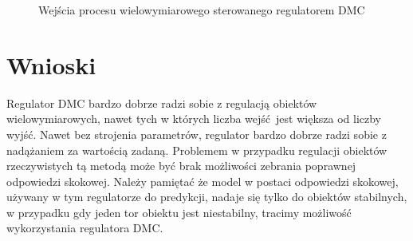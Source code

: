 \begin{figure}
    \begin{subfigure}[b]{\textwidth}
        \centering
    \end{subfigure}
    \caption{Wejścia procesu wielowymiarowego sterowanego regulatorem DMC}
    \label{pro_dmc_2_in}
\end{figure}
\FloatBarrier

\section{Wnioski}
\label{pro_dmc_wnioski}

Regulator DMC bardzo dobrze radzi sobie z regulacją obiektów wielowymiarowych, nawet 
tych w których liczba wejść jest większa od liczby wyjść. Nawet bez strojenia parametrów,
regulator bardzo dobrze radzi sobie z nadążaniem za wartością zadaną. Problemem w przypadku
regulacji obiektów rzeczywistych tą metodą może być brak możliwości zebrania poprawnej 
odpowiedzi skokowej. Należy pamiętać że model w postaci odpowiedzi skokowej, używany w tym regulatorze
do predykcji, nadaje się tylko do obiektów stabilnych, w przypadku gdy jeden tor obiektu jest
niestabilny, tracimy możliwość wykorzystania regulatora DMC.
